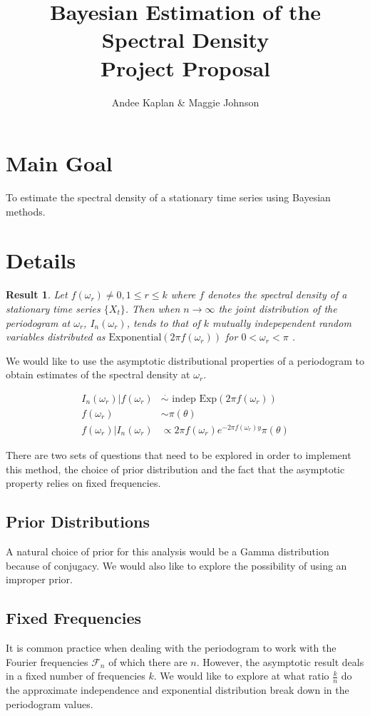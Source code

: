 \documentclass{article}\usepackage[]{graphicx}\usepackage[]{color}
\title{Bayesian Estimation of the Spectral Density \\ {\small Project Proposal}}
\author{Andee Kaplan \& Maggie Johnson}
\theoremstyle{plain}
\newtheorem*{res}{Result}
\begin{document}
\maketitle

\section*{Main Goal}
To estimate the spectral density of a stationary time series using Bayesian methods.

\section*{Details}
\begin{res}
Let $f(\omega_r) \not= 0, 1 \le r \le k$ where $f$ denotes the spectral density of a stationary time series $\{X_t\}$. Then when $n\rightarrow \infty$ the joint distribution of the periodogram at $\omega_r$, $I_n(\omega_r)$, tends to that of $k$ mutually indepependent random variables distributed as $\text{Exponential}(2\pi f(\omega_r))$ for $0<\omega_r<\pi$ \cite{JAZ:4921656}.
\end{res}

We would like to use the asymptotic distributional properties of a periodogram to obtain estimates of the spectral density at $\omega_r$.

\begin{align*}
I_n(\omega_r) |f(\omega_r) &\stackrel{\cdot}{\sim}\text{ indep } \text{Exp}(2\pi f(\omega_r)) \\
f(\omega_r) & \sim \pi(\theta)\\
f(\omega_r) | I_n(\omega_r) &\propto 2\pi f(\omega_r) e^{-2\pi f(\omega_r) y} \pi(\theta)
\end{align*}

There are two sets of questions that need to be explored in order to implement this method, the choice of prior distribution and the fact that the asymptotic property relies on fixed frequencies.

\subsection*{Prior Distributions}
A natural choice of prior for this analysis would be a Gamma distribution because of conjugacy. We would also like to explore the possibility of using an improper prior.

\subsection*{Fixed Frequencies}
It is common practice when dealing with the periodogram to work with the Fourier frequencies $\mathcal{F}_n$ of which there are $n$. However, the asymptotic result deals in a fixed number of frequencies $k$. We would like to explore at what ratio $\frac{k}{n}$ do the approximate independence and exponential distribution break down in the periodogram values.
\end{document}
